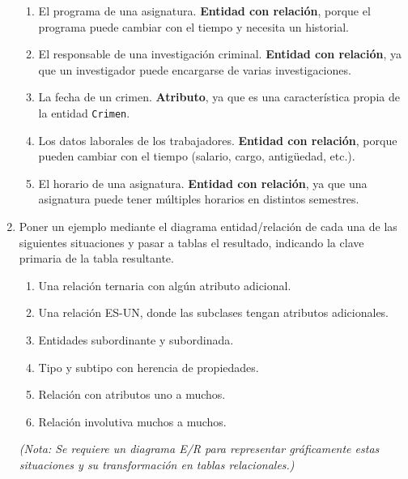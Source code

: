 \begin{enumerate}[label=\textbf{\arabic*.}, itemsep=0.5em]
\begin{enumerate}
        \item El programa de una asignatura.  
        \textbf{Entidad con relación}, porque el programa puede cambiar con el tiempo y necesita un historial.

        \item El responsable de una investigación criminal.  
        \textbf{Entidad con relación}, ya que un investigador puede encargarse de varias investigaciones.

        \item La fecha de un crimen.  
        \textbf{Atributo}, ya que es una característica propia de la entidad \texttt{Crimen}.

        \item Los datos laborales de los trabajadores.  
        \textbf{Entidad con relación}, porque pueden cambiar con el tiempo (salario, cargo, antigüedad, etc.).

        \item El horario de una asignatura.  
        \textbf{Entidad con relación}, ya que una asignatura puede tener múltiples horarios en distintos semestres.
    \end{enumerate}

    \item Poner un ejemplo mediante el diagrama entidad/relación de cada una de las siguientes situaciones y pasar a tablas el resultado, indicando la clave primaria de la tabla resultante.
    \begin{enumerate}
        \item Una relación ternaria con algún atributo adicional.
        \item Una relación ES-UN, donde las subclases tengan atributos adicionales.
        \item Entidades subordinante y subordinada.
        \item Tipo y subtipo con herencia de propiedades.
        \item Relación con atributos uno a muchos.
        \item Relación involutiva muchos a muchos.
    \end{enumerate}

    \textit{(Nota: Se requiere un diagrama E/R para representar gráficamente estas situaciones y su transformación en tablas relacionales.)}


\end{enumerate}
